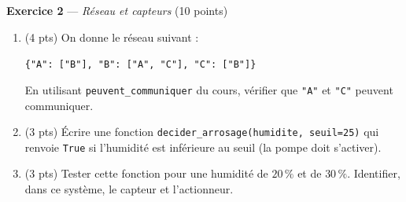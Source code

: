 \bigskip

\textbf{Exercice 2} --- \textit{Réseau et capteurs} \hfill (10 points)

\begin{enumerate}
  \item (4 pts) On donne le réseau suivant :
  \begin{center}\lstinline|{"A": ["B"], "B": ["A", "C"], "C": ["B"]}|\end{center}
  En utilisant \lstinline{peuvent_communiquer} du cours, vérifier que \lstinline{"A"}
  et \lstinline{"C"} peuvent communiquer.
  \item (3 pts) Écrire une fonction \lstinline{decider_arrosage(humidite, seuil=25)} qui renvoie \lstinline{True} si l'humidité est inférieure au seuil (la pompe doit s'activer).
  \item (3 pts) Tester cette fonction pour une humidité de $20\,\%$ et de $30\,\%$. Identifier, dans ce système, le capteur et l'actionneur.
\end{enumerate}

